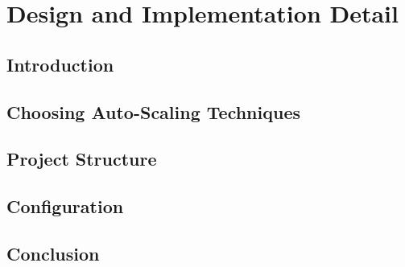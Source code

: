 \chapter{Design and Implementation Detail}
\label{design}

\section{Introduction}
\label{des:intro}


\section{Choosing Auto-Scaling Techniques}
\label{des:choose}

\section{Project Structure}
\label{des:proj}

\section{Configuration}
\label{des:conf}

\section{Conclusion}
\label{des:conc}